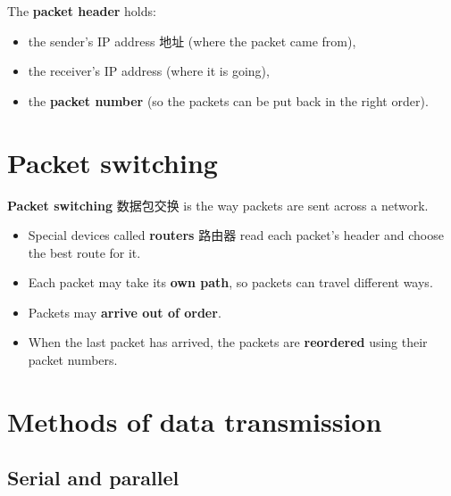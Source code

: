 \documentclass[11pt]{article}
\begin{document}
The \textbf{packet header} holds:

\begin{itemize}
\item the sender's IP address 地址 (where the packet came from),

\item the receiver's IP address (where it is going),

\item the \textbf{packet number} (so the packets can be put back in the right order).

\end{itemize}

\section*{Packet switching}

\textbf{Packet switching} 数据包交换 is the way packets are sent across a network.

\begin{itemize}
\item Special devices called \textbf{routers} 路由器 read each packet's header and choose the best route for it.

\item Each packet may take its \textbf{own path}, so packets can travel different ways.

\item Packets may \textbf{arrive out of order}.

\item When the last packet has arrived, the packets are \textbf{reordered} using their packet numbers.

\end{itemize}

\section*{Methods of data transmission}

\subsection*{Serial and parallel}

\begin{center}
\end{center}
\end{document}
